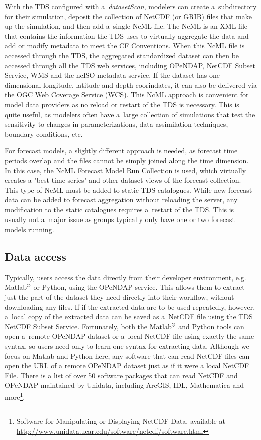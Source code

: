\documentclass[osd, online, hvmath]{copernicus}
\begin{document}
With the TDS configured with a~\textit{datasetScan}, modelers can
create a~subdirectory for their simulation, deposit the collection of
NetCDF (or GRIB) files that make up the simulation, and then add
a~single NcML file. The NcML is an XML file that contains the
information the TDS uses to virtually aggregate the data and add or modify
metadata to meet the CF Conventions. When this NcML file is accessed
through the TDS, the aggregated standardized dataset can then be
accessed through all the TDS web services, including OPeNDAP, NetCDF
Subset Service, WMS and the ncISO metadata service.  If the dataset has one dimensional longitude, latitude and depth coorindates, it can also be delivered via the OGC Web Coverage Service (WCS). This NcML approach is convenient for model data providers as no reload or
restart of the TDS is necessary.  This is quite useful, as modelers often have a~large collection of simulations that test
the sensitivity to changes in parameterizations, data
assimilation techniques, boundary conditions, etc.

For forecast models, a slightly different approach is needed, as forecast time periods
overlap and the files cannot be simply joined along the time dimension.  In this case, the NcML Forecast Model Run Collection is used, which virtually creates a "best time series"  and other dataset views of the forecast collection.  This type of NcML must
be added to static TDS catalogues. While new forecast data can be added to
forecast aggregation without reloading the server, any modification to
the static catalogues requires a~restart of the TDS. This is usually not
a~major issue as groups typically only have one or two forecast models
running.   

\subsection{Data access}

Typically, users access the data directly from their developer
environment, e.g.  Matlab$^{\text{\textregistered}}$ or Python, using
the OPeNDAP service. This allows them to extract just the part of the dataset
they need directly into their workflow, without downloading any files. 
If if the extracted data are to be used
repeatedly, however, a~local copy of the extracted data can be saved as
a~NetCDF file using the TDS NetCDF Subset Service. Fortunately, both
the Matlab$^{\text{\textregistered}}$ and Python tools can open
a~remote OPeNDAP dataset or a~local NetCDF file using exactly the same
syntax, so users need only 
to learn one syntax for extracting data.  Although we focus on Matlab and Python here, any software that can read NetCDF files can open the URL of a remote OPeNDAP dataset just as if it were a local NetCDF File.  There is a list of over 50 software packages that can read NetCDF and OPeNDAP maintained by Unidata, including ArcGIS, IDL, Mathematica and more\footnote{Software for Manipulating or Displaying NetCDF Data, available at 
  \url{http://www.unidata.ucar.edu/software/netcdf/software.html}}. 
\end{document}
